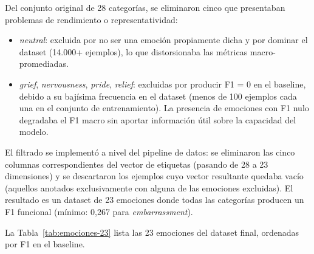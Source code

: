 Del conjunto original de 28 categorías, se eliminaron cinco que presentaban problemas
de rendimiento o representatividad:

\begin{itemize}[nosep]
    \item \textit{neutral}: excluida por no ser una emoción propiamente dicha y por
    dominar el dataset (14.000+ ejemplos), lo que distorsionaba las métricas
    macro-promediadas.
    \item \textit{grief}, \textit{nervousness}, \textit{pride}, \textit{relief}:
    excluidas por producir F1 = 0 en el baseline, debido a su bajísima frecuencia en
    el dataset (menos de 100 ejemplos cada una en el conjunto de entrenamiento). La
    presencia de emociones con F1 nulo degradaba el F1 macro sin aportar información
    útil sobre la capacidad del modelo.
\end{itemize}

El filtrado se implementó a nivel del pipeline de datos: se eliminaron las cinco
columnas correspondientes del vector de etiquetas (pasando de 28 a 23 dimensiones) y
se descartaron los ejemplos cuyo vector resultante quedaba vacío (aquellos anotados
exclusivamente con alguna de las emociones excluidas). El resultado es un dataset de
23 emociones donde todas las categorías producen un F1 funcional (mínimo: 0{,}267
para \textit{embarrassment}).

La Tabla~\ref{tab:emociones-23} lista las 23 emociones del dataset final, ordenadas
por F1 en el baseline.

